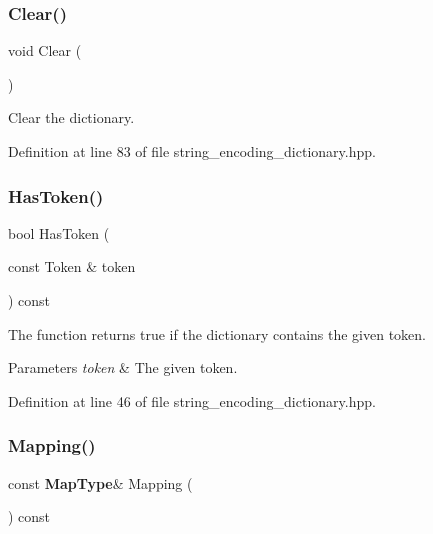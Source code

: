 \subsubsection{Clear()}
{\footnotesize\ttfamily void Clear (\begin{DoxyParamCaption}{ }\end{DoxyParamCaption})\hspace{0.3cm}{\ttfamily [inline]}}



Clear the dictionary. 



Definition at line 83 of file string\+\_\+encoding\+\_\+dictionary.\+hpp.

\mbox{\label{classmlpack_1_1data_1_1StringEncodingDictionary_a0822da0e4b21f9f071c45608515d2729}} 
\subsubsection{Has\+Token()}
{\footnotesize\ttfamily bool Has\+Token (\begin{DoxyParamCaption}\item[{const Token \&}]{token }\end{DoxyParamCaption}) const\hspace{0.3cm}{\ttfamily [inline]}}



The function returns true if the dictionary contains the given token. 


\begin{DoxyParams}{Parameters}
{\em token} & The given token. \\
\hline
\end{DoxyParams}


Definition at line 46 of file string\+\_\+encoding\+\_\+dictionary.\+hpp.

\mbox{\label{classmlpack_1_1data_1_1StringEncodingDictionary_aa2eae80cec94bbeb1f8bc25367fc0305}} 
\subsubsection{Mapping()\hspace{0.1cm}{\footnotesize\ttfamily [1/2]}}
{\footnotesize\ttfamily const \textbf{ Map\+Type}\& Mapping (\begin{DoxyParamCaption}{ }\end{DoxyParamCaption}) const\hspace{0.3cm}{\ttfamily [inline]}}



